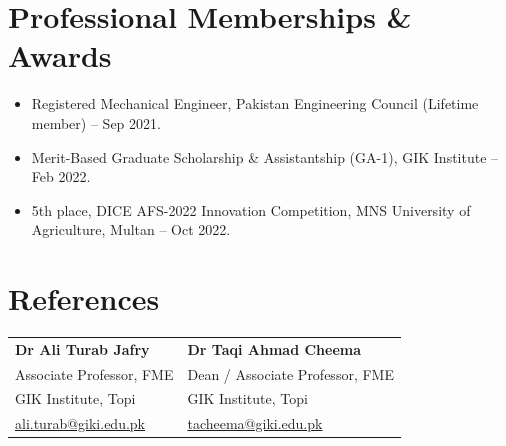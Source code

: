 \documentclass[11pt,a4paper]{article}
\begin{document}
\section{Professional Memberships \& Awards}
\begin{itemize}
  \item Registered Mechanical Engineer, Pakistan Engineering Council
        (Lifetime member) -- Sep 2021.
  \item Merit-Based Graduate Scholarship \& Assistantship (GA-1), GIK Institute
        -- Feb 2022.
  \item 5th place, DICE AFS-2022 Innovation Competition, MNS University of
        Agriculture, Multan -- Oct 2022.
\end{itemize}

\section{References}

\begin{tabularx}{\textwidth}{@{}XX@{}}
\textbf{Dr Ali Turab Jafry}       & \textbf{Dr Taqi Ahmad Cheema} \\
Associate Professor, FME          & Dean / Associate Professor, FME \\
GIK Institute, Topi               & GIK Institute, Topi \\
\href{mailto:ali.turab@giki.edu.pk}{ali.turab@giki.edu.pk}
  & \href{mailto:tacheema@giki.edu.pk}{tacheema@giki.edu.pk} \\
\end{tabularx}
\end{document}
